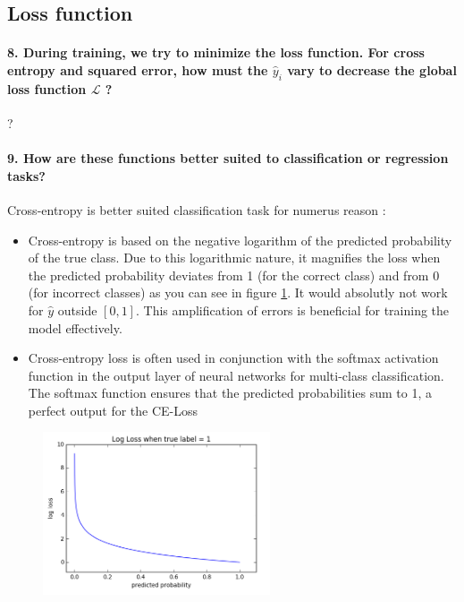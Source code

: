 \documentclass{article}
\theoremstyle{plain}%
\theoremstyle{definition}
\theoremstyle{remark}
\begin{document}
\subsection{Loss function}
\paragraph{8. During training, we try to minimize the loss function. For cross entropy and squared error, how must the $ \hat{y}_i $  vary to decrease the global loss function $ \mathcal{L} $ ?}
?

\paragraph{9. How are these functions better suited to classification or regression tasks?}
Cross-entropy is better suited classification task for numerus reason : 
\begin{itemize}
    \item Cross-entropy is based on the negative logarithm of the predicted probability of the true class. Due to this logarithmic nature, it magnifies the loss when the predicted probability deviates from 1 (for the correct class) and from 0 (for incorrect classes) as you can see in figure \ref{CELoss}. It would absolutly not work for $ \hat{y} $ outside $ [0,1] $. This amplification of errors is beneficial for training the model effectively. 
    \item Cross-entropy loss is often used in conjunction with the softmax activation function in the output layer of neural networks for multi-class classification. The softmax function ensures that the predicted probabilities sum to 1, a perfect output for the CE-Loss
\end{itemize} 
\begin{figure}[!htbp]
    \centering
    \includegraphics*[width=0.6\textwidth]{figs/cross_entropy.png}
    \label{CELoss}
\end{figure}
\end{document}
